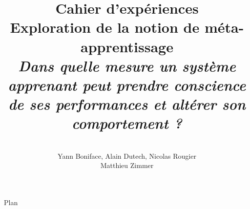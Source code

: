 \documentclass[a4paper,12pt]{article}
\title{
  \textbf{Cahier d'expériences}
  \\[5cm]
  Exploration de la notion de méta-apprentissage
  \\[3cm]
  \textit{
  Dans quelle mesure un système apprenant peut prendre conscience de ses performances
  et altérer son comportement ?}
}
\author{
  \\[3cm]
  Yann Boniface, Alain Dutech, Nicolas Rougier \\
  Matthieu Zimmer}
\begin{document}
  \maketitle
  \newpage

  \begin{center}{\Large Plan }\end{center}
  \tableofcontents
  \newpage

  
\end{document}
